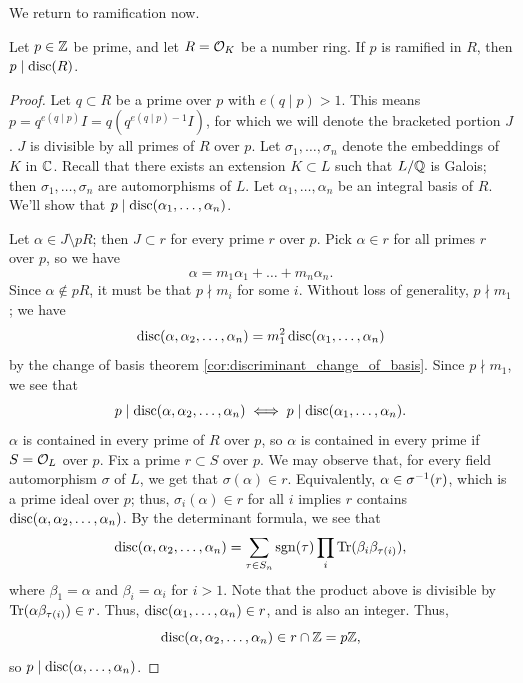 We return to ramification now.
\begin{theorem} \label{thm:ramification_implies_divisible_into_discriminant}
    Let $p \in \mathbb Z$ be prime, and let $R = \mathcal O_K$ be a number ring. If $p$ is ramified in $R$, then $p \mid \operatorname{disc}(R)$.
\end{theorem}
\begin{proof}
    Let $q \subset R$ be a prime over $p$ with $e(q \mid p) > 1$. This means $p = q^{e(q \mid p)} I = q (q^{e(q \mid p) - 1} I)$, for which we will denote the bracketed portion $J$. $J$ is divisible by all primes of $R$ over $p$. Let $\sigma_1, \dots, \sigma_n$ denote the embeddings of $K$ in $\mathbb C$. Recall that there exists an extension $K \subset L$ such that $L/\mathbb Q$ is Galois; then $\sigma_1, \dots, \sigma_n$ are automorphisms of $L$. Let $\alpha_1, \dots, \alpha_n$ be an integral basis of $R$. We'll show that $p \mid \operatorname{disc}(\alpha_1, \dots, \alpha_n)$.

    Let $\alpha \in J \setminus p R$; then $J \subset r$ for every prime $r$ over $p$. Pick $\alpha \in r$ for all primes $r$ over $p$, so we have
    \[ \alpha = m_1\alpha_1 + \dots + m_n\alpha_n. \]
    Since $\alpha \notin pR$, it must be that $p \nmid m_i$ for some $i$. Without loss of generality, $p \nmid m_1$; we have
    \[ \operatorname{disc}(\alpha, \alpha_2, \dots, \alpha_n) = m_1^2 \operatorname{disc}(\alpha_1, \dots, \alpha_n) \]
    by the change of basis theorem \ref{cor:discriminant_change_of_basis}. Since $p \nmid m_1$, we see that
    \[ p \mid \operatorname{disc}(\alpha, \alpha_2, \dots, \alpha_n) \iff p \mid \operatorname{disc}(\alpha_1, \dots, \alpha_n). \]
    $\alpha$ is contained in every prime of $R$ over $p$, so $\alpha$ is contained in every prime if $S = \mathcal O_L$ over $p$. Fix a prime $r \subset S$ over $p$. We may observe that, for every field automorphism $\sigma$ of $L$, we get that $\sigma(\alpha) \in r$. Equivalently, $\alpha \in \sigma^{-1}(r)$, which is a prime ideal over $p$; thus, $\sigma_i(\alpha) \in r$ for all $i$ implies $r$ contains $\operatorname{disc}(\alpha, \alpha_2, \dots, \alpha_n)$. By the determinant formula, we see that
    \[ \operatorname{disc}(\alpha, \alpha_2, \dots, \alpha_n) = \sum_{\tau \in S_n} \operatorname{sgn}(\tau) \prod_i \operatorname{Tr} (\beta_i \beta_{\tau(i)}), \]
    where $\beta_1 = \alpha$ and $\beta_i = \alpha_i$ for $i > 1$. Note that the product above is divisible by $\operatorname{Tr}(\alpha \beta_{\tau(i)}) \in r$. Thus, $\operatorname{disc}(\alpha_1, \dots, \alpha_n) \in r$, and is also an integer. Thus,
    \[ \operatorname{disc}(\alpha, \alpha_2, \dots, \alpha_n) \in r \cap \mathbb Z = p \mathbb Z, \]
    so $p \mid \operatorname{disc}(\alpha, \dots, \alpha_n)$.
\end{proof}

